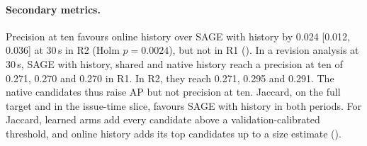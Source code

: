 \paragraph{Secondary metrics.}
Precision at ten favours online history over SAGE with history by 0.024 [0.012, 0.036] at 30\,s in R2 (Holm $p=0.0024$), but not in R1 ().
In a revision analysis at 30\,s, SAGE with history, shared and native history reach a precision at ten of 0.271, 0.270 and 0.270 in R1.
In R2, they reach 0.271, 0.295 and 0.291.
The native candidates thus raise AP but not precision at ten.
Jaccard, on the full target and in the issue-time slice, favours SAGE with history in both periods.
For Jaccard, learned arms add every candidate above a validation-calibrated threshold, and online history adds its top candidates up to a size estimate ().

